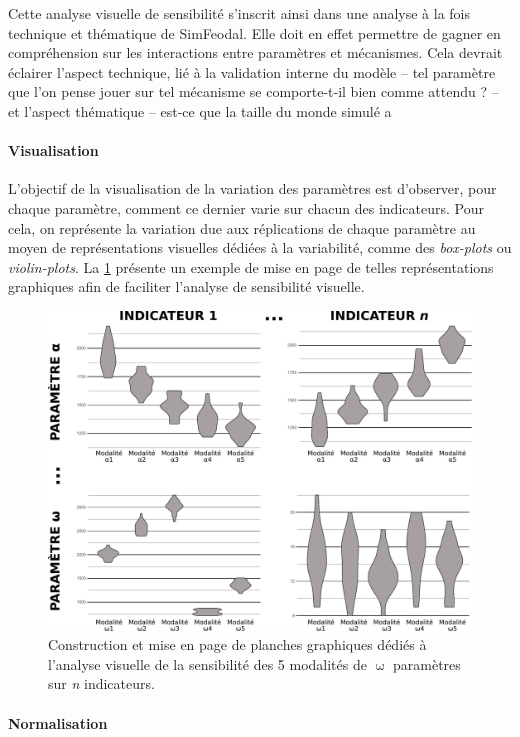 Cette analyse visuelle de sensibilité s'inscrit ainsi dans une analyse à la fois technique et thématique de SimFeodal.
Elle doit en effet permettre de gagner en compréhension sur les interactions entre paramètres et mécanismes.
Cela devrait éclairer l'aspect technique, lié à la validation interne du modèle -- tel paramètre que l'on pense jouer sur tel mécanisme se comporte-t-il bien comme attendu ? -- et l'aspect thématique -- est-ce que la taille du monde simulé a 


\paragraph{Visualisation}

L'objectif de la visualisation de la variation des paramètres est d'observer, pour chaque paramètre, comment ce dernier varie sur chacun des indicateurs.
Pour cela, on représente la variation due aux réplications de chaque paramètre au moyen de représentations visuelles dédiées à la variabilité, comme des \textit{box-plots} ou \textit{violin-plots}.
La \cref{fig:exemple-visu-sensib} présente un exemple de mise en page de telles représentations graphiques afin de faciliter l'analyse de sensibilité visuelle.
\begin{figure}[H]
	\centering
	\includegraphics[width=.9\linewidth]{img/schema_violinplots_sensib.pdf}
	\caption{Construction et mise en page de planches graphiques dédiés à l'analyse visuelle de la sensibilité des 5 modalités de $\upomega$ paramètres sur \textit{n} indicateurs.}
	\label{fig:exemple-visu-sensib}
\end{figure}

\paragraph{Normalisation}

